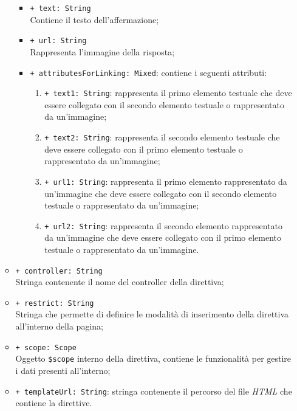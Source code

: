 \begin{itemize}
\begin{itemize}
\begin{itemize}
					\item \texttt{+ text: String} \\ Contiene il testo dell'affermazione;
					\item \texttt{+ url: String} \\ Rappresenta l'immagine della risposta;
					\item \texttt{+ attributesForLinking: Mixed}: contiene i seguenti attributi:
					\begin{enumerate}
						\item \texttt{+ text1: String}: rappresenta il primo elemento testuale che deve essere collegato con il secondo elemento testuale o rappresentato da un’immagine;
						\item \texttt{+ text2: String}: rappresenta il secondo elemento testuale che deve essere collegato con il primo elemento testuale o rappresentato da un’immagine;
						\item \texttt{+ url1: String}: rappresenta il primo elemento rappresentato da un'immagine che deve essere collegato con il secondo elemento testuale o rappresentato da un’immagine;
						\item \texttt{+ url2: String}: rappresenta il secondo elemento rappresentato da un'immagine che deve essere collegato con il primo elemento testuale o rappresentato da un’immagine.
					\end{enumerate}
				\end{itemize}
				\item \texttt{+ controller: String} \\ Stringa contenente il nome del controller della direttiva;
				\item \texttt{+ restrict: String} \\ Stringa che permette di definire le modalità di inserimento della direttiva all'interno della pagina;
				\item \texttt{+ scope: Scope} \\Oggetto \texttt{\$scope} interno della direttiva, contiene le funzionalità per gestire i dati presenti all'interno;
				\item \texttt{+ templateUrl: String}: stringa contenente il percorso del file \textit{HTML} che contiene la direttive.
					
			\end{itemize}
		\end{itemize}
	